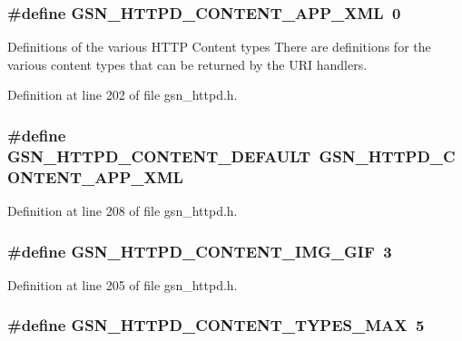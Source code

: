 \hypertarget{a00666_ga3004294919c3368623df769bbbc8e843}{
\subsubsection[{GSN\_\-HTTPD\_\-CONTENT\_\-APP\_\-XML}]{\setlength{\rightskip}{0pt plus 5cm}\#define GSN\_\-HTTPD\_\-CONTENT\_\-APP\_\-XML~0}}
\label{a00666_ga3004294919c3368623df769bbbc8e843}


Definitions of the various HTTP Content types There are definitions for the various content types that can be returned by the URI handlers. 



Definition at line 202 of file gsn\_\-httpd.h.

\hypertarget{a00666_gafd71fee266007e7dd46c2453ed351e18}{
\subsubsection[{GSN\_\-HTTPD\_\-CONTENT\_\-DEFAULT}]{\setlength{\rightskip}{0pt plus 5cm}\#define GSN\_\-HTTPD\_\-CONTENT\_\-DEFAULT~GSN\_\-HTTPD\_\-CONTENT\_\-APP\_\-XML}}
\label{a00666_gafd71fee266007e7dd46c2453ed351e18}


Definition at line 208 of file gsn\_\-httpd.h.

\hypertarget{a00666_gac415fd2b4698131654ed19395cc07941}{
\subsubsection[{GSN\_\-HTTPD\_\-CONTENT\_\-IMG\_\-GIF}]{\setlength{\rightskip}{0pt plus 5cm}\#define GSN\_\-HTTPD\_\-CONTENT\_\-IMG\_\-GIF~3}}
\label{a00666_gac415fd2b4698131654ed19395cc07941}


Definition at line 205 of file gsn\_\-httpd.h.

\hypertarget{a00666_ga401387dbe1a0b570c26f495cbd92e53a}{
\subsubsection[{GSN\_\-HTTPD\_\-CONTENT\_\-TYPES\_\-MAX}]{\setlength{\rightskip}{0pt plus 5cm}\#define GSN\_\-HTTPD\_\-CONTENT\_\-TYPES\_\-MAX~5}}
\label{a00666_ga401387dbe1a0b570c26f495cbd92e53a}


